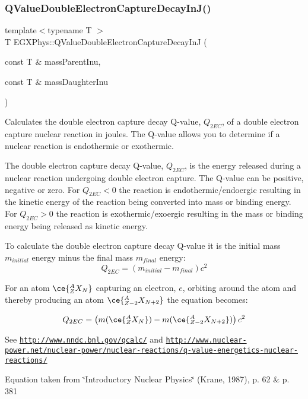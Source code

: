 \subsubsection{\texorpdfstring{Q\+Value\+Double\+Electron\+Capture\+Decay\+In\+J()}{QValueDoubleElectronCaptureDecayInJ()}}
{\footnotesize\ttfamily template$<$typename T $>$ \\
T E\+G\+X\+Phys\+::\+Q\+Value\+Double\+Electron\+Capture\+Decay\+InJ (\begin{DoxyParamCaption}\item[{const T \&}]{mass\+Parent\+Inu,  }\item[{const T \&}]{mass\+Daughter\+Inu }\end{DoxyParamCaption})}



Calculates the double electron capture decay Q-\/value, $Q_{2EC}$, of a double electron capture nuclear reaction in joules. The Q-\/value allows you to determine if a nuclear reaction is endothermic or exothermic. 

The double electron capture decay Q-\/value, $Q_{2EC}$, is the energy released during a nuclear reaction undergoing double electron capture. The Q-\/value can be positive, negative or zero. For $Q_{2EC} < 0$ the reaction is endothermic/endoergic resulting in the kinetic energy of the reaction being converted into mass or binding energy. For $Q_{2EC} > 0$ the reaction is exothermic/exoergic resulting in the mass or binding energy being released as kinetic energy.

To calculate the double electron capture decay Q-\/value it is the initial mass $m_{initial}$ energy minus the final mass $m_{final}$ energy\+: \[Q_{2EC} = \left ( m_{initial}-m_{final}\right ) c^2\]

For an atom $\ce{ ^{A}_{Z}X_{N} }$ capturing an electron, $e$, orbiting around the atom and thereby producing an atom $\ce{ ^{A}_{Z-2}X_{N{+2}} }$ the equation becomes\+:

\[Q_{2EC} = \left ( m(\ce{ ^{A}_{Z}X_{N} }) - m(\ce{ ^{A}_{Z-2}X_{N{+2}} }) \right ) c^2\]

See \href{http://www.nndc.bnl.gov/qcalc/}{\tt http\+://www.\+nndc.\+bnl.\+gov/qcalc/} and \href{http://www.nuclear-power.net/nuclear-power/nuclear-reactions/q-value-energetics-nuclear-reactions/}{\tt http\+://www.\+nuclear-\/power.\+net/nuclear-\/power/nuclear-\/reactions/q-\/value-\/energetics-\/nuclear-\/reactions/}

Equation taken from \char`\"{}\+Introductory Nuclear Physics\char`\"{} (Krane, 1987), p. 62 \& p. 381


